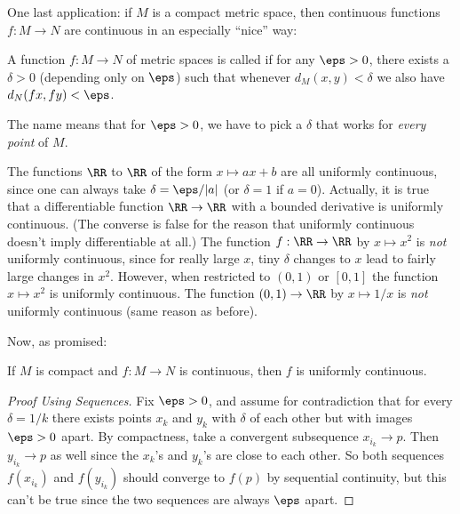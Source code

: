 One last application: if $M$ is a compact metric space, then continuous functions $f : M \to N$
are continuous in an especially ``nice'' way:
\begin{definition}
	A function $f : M \to N$ of metric spaces is called 
	if for any $\eps > 0$, there exists a $\delta > 0$ (depending only on $\eps$) such that 
	whenever $d_M(x,y) < \delta$ we also have $d_N(fx, fy) < \eps$.	
\end{definition}
The name means that for $\eps > 0$,
we have to pick a $\delta$ that works for \emph{every point} of $M$.
\begin{example}
	\listhack
	\begin{enumerate}[(a)]
		\ii The functions $\RR$ to $\RR$ of the form $x \mapsto ax+b$ are all uniformly continuous,
		since one can always take $\delta = \eps/|a|$ (or $\delta=1$ if $a=0$).
		\ii Actually, it is true that a differentiable function $\RR \to \RR$
		with a bounded derivative is uniformly continuous.
		(The converse is false for the reason that uniformly continuous doesn't imply differentiable at all.)
		\ii The function $f : \RR \to \RR$ by $x \mapsto x^2$
		is \emph{not} uniformly continuous, since for really large $x$,
		tiny $\delta$ changes to $x$ lead to fairly large changes in $x^2$.
		\ii However, when restricted to $(0,1)$ or $[0,1]$ the function $x \mapsto x^2$ is uniformly continuous.
		\ii The function $(0,1) \to \RR$ by $x \mapsto 1/x$ is \emph{not} uniformly continuous
		(same reason as before).
	\end{enumerate}
\end{example}

Now, as promised:
\begin{proposition}
	If $M$ is compact and $f : M \to N$ is continuous,
	then $f$ is uniformly continuous.
\end{proposition}
\begin{proof}[Proof Using Sequences]
	Fix $\eps > 0$, and assume for contradiction
	that for every $\delta = 1/k$ there exists points $x_k$ and $y_k$ with $\delta$ of each
	other but with images $\eps > 0$ apart.
	By compactness, take a convergent subsequence $x_{i_k} \to p$.
	Then $y_{i_k} \to p$ as well since the $x_k$'s and $y_k$'s are close to each other.
	So both sequences $f(x_{i_k})$ and $f(y_{i_k})$ should converge to $f(p)$ by sequential continuity,
	but this can't be true since the two sequences are always $\eps$ apart.
\end{proof}

